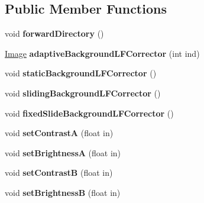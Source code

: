 \subsection*{Public Member Functions}
\begin{DoxyCompactItemize}
\item 
void {\bfseries forward\+Directory} ()\hypertarget{classAdaptiveLightfield_a193b5267bd93c58fc303dfd8dd713c71}{}\label{classAdaptiveLightfield_a193b5267bd93c58fc303dfd8dd713c71}

\item 
\hyperlink{classImage}{Image} {\bfseries adaptive\+Background\+L\+F\+Corrector} (int ind)\hypertarget{classAdaptiveLightfield_af114596f625e67260c93e1ecdca42e07}{}\label{classAdaptiveLightfield_af114596f625e67260c93e1ecdca42e07}

\item 
void {\bfseries static\+Background\+L\+F\+Corrector} ()\hypertarget{classAdaptiveLightfield_ad824c77f245a5257ef9d63f1245790c2}{}\label{classAdaptiveLightfield_ad824c77f245a5257ef9d63f1245790c2}

\item 
void {\bfseries sliding\+Background\+L\+F\+Corrector} ()\hypertarget{classAdaptiveLightfield_a57da703b77df5798a858df348f8b9d11}{}\label{classAdaptiveLightfield_a57da703b77df5798a858df348f8b9d11}

\item 
void {\bfseries fixed\+Slide\+Background\+L\+F\+Corrector} ()\hypertarget{classAdaptiveLightfield_a4adca7182ab1c7bc9edb11998fe474b9}{}\label{classAdaptiveLightfield_a4adca7182ab1c7bc9edb11998fe474b9}

\item 
void {\bfseries set\+ContrastA} (float in)\hypertarget{classAdaptiveLightfield_a4c254a9f404bf7570189c8f88d0e03e9}{}\label{classAdaptiveLightfield_a4c254a9f404bf7570189c8f88d0e03e9}

\item 
void {\bfseries set\+BrightnessA} (float in)\hypertarget{classAdaptiveLightfield_a016cc9d5a5426053c7ad3f1ca6dea3a0}{}\label{classAdaptiveLightfield_a016cc9d5a5426053c7ad3f1ca6dea3a0}

\item 
void {\bfseries set\+ContrastB} (float in)\hypertarget{classAdaptiveLightfield_af82d6fd4ace796e51a504aa4b08865c4}{}\label{classAdaptiveLightfield_af82d6fd4ace796e51a504aa4b08865c4}

\item 
void {\bfseries set\+BrightnessB} (float in)\hypertarget{classAdaptiveLightfield_aed74c18f2288a64236be497b42439df2}{}\label{classAdaptiveLightfield_aed74c18f2288a64236be497b42439df2}


\end{DoxyCompactItemize}

